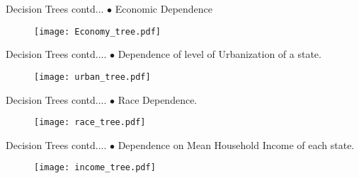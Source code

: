 \documentclass{beamer}
\begin{document}

\begin{frame}{Decision Trees contd...}
$\bullet$ Economic Dependence

\begin{figure}[h!]
	\begin{center}
		\texttt{[image: Economy\_tree.pdf]}
		\end{center}
\end{figure}

\end{frame}


\begin{frame}{Decision Trees contd....}
$\bullet$ Dependence of level of Urbanization of a state.

\begin{figure}[h!]
	\begin{center}
		\texttt{[image: urban\_tree.pdf]}
		\end{center}
\end{figure}

\end{frame}


\begin{frame}{Decision Trees contd....}
$\bullet$ Race Dependence.

\begin{figure}[h!]
	\begin{center}
		\texttt{[image: race\_tree.pdf]}
		\end{center}
\end{figure}

\end{frame}


\begin{frame}{Decision Trees contd....}
$\bullet$ Dependence on Mean Household Income of each state.

\begin{figure}[h!]
	\begin{center}
		\texttt{[image: income\_tree.pdf]}
		\end{center}
\end{figure}

\end{frame}

\end{document}
